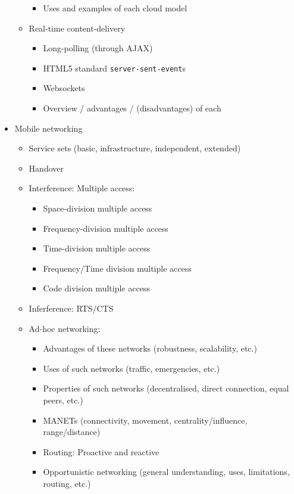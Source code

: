 \documentclass[11pt,a4paper]{report}
\begin{document}
\begin{itemize}
\begin{itemize}
\begin{itemize}
                    \item Uses and examples of each cloud model
                \end{itemize}
            \item Real-time content-delivery
                \begin{itemize}
                    \item Long-polling (through AJAX)
                    \item HTML5 standard \texttt{server-sent-event}s
                    \item Websockets
                    \item Overview / advantages / (disadvantages) of each
                \end{itemize}
        \end{itemize}

    \item Mobile networking
        \begin{itemize}
            \item Service sets (basic, infrastructure, independent, extended)
            \item Handover
            \item Interference: Multiple access:
                \begin{itemize}
                    \item Space-division multiple access
                    \item Frequency-division multiple access
                    \item Time-division multiple access
                    \item Frequency/Time division multiple access
                    \item Code division multiple access
                \end{itemize}
            \item Inferference: RTS/CTS
            \item Ad-hoc networking:
                \begin{itemize}
                    \item Advantages of these networks (robustness, scalability, etc.)
                    \item Uses of such networks (traffic, emergencies, etc.)
                    \item Properties of such networks (decentralised, direct connection, equal peers, etc.)
                    \item MANETs (connectivity, movement, centrality/influence, range/distance)
                    \item Routing: Proactive and reactive
                    \item Opportunistic networking (general understanding, uses, limitations, routing, etc.)
                \end{itemize}
        \end{itemize}


\end{itemize}
\end{document}
